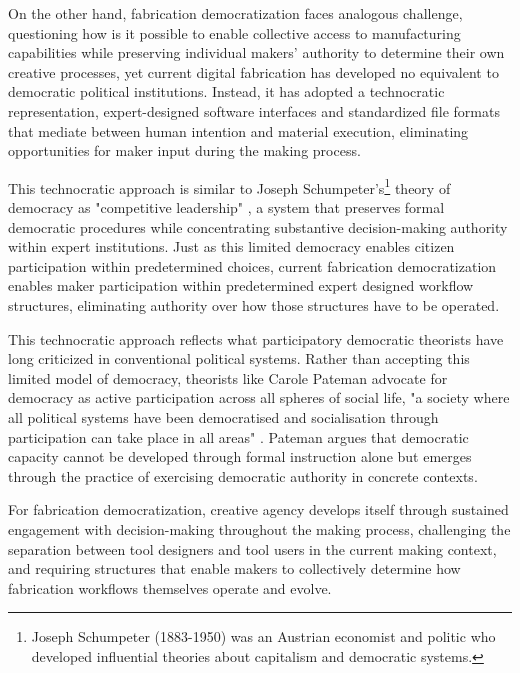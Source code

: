 \vspace{0.5cm}

On the other hand, fabrication democratization faces analogous challenge, questioning how is it possible to enable collective access to manufacturing capabilities while preserving individual makers' authority to determine their own creative processes, yet current digital fabrication has developed no equivalent to democratic political institutions. Instead, it has adopted a technocratic representation, expert-designed software interfaces and standardized file formats that mediate between human intention and material execution, eliminating opportunities for maker input during the making process.

\vspace{0.5cm}

This technocratic approach is similar to Joseph Schumpeter's\footnote{Joseph Schumpeter (1883-1950) was an Austrian economist and politic who developed influential theories about capitalism and democratic systems.} theory of democracy as "competitive leadership" \citep{schumpeter1950}, a system that preserves formal democratic procedures while concentrating substantive decision-making authority within expert institutions. Just as this limited democracy enables citizen participation within predetermined choices, current fabrication democratization enables maker participation within predetermined expert designed workflow structures, eliminating authority over how those structures have to be operated.

\vspace{0.5cm}

This technocratic approach reflects what participatory democratic theorists have long criticized in conventional political systems. Rather than accepting this limited model of democracy, theorists like Carole Pateman advocate for democracy as active participation across all spheres of social life, "a society where all political systems have been democratised and socialisation through participation can take place in all areas" \citep{pateman1976}. Pateman argues that democratic capacity cannot be developed through formal instruction alone but emerges through the practice of exercising democratic authority in concrete contexts.

\vspace{0.5cm}

For fabrication democratization, creative agency develops itself through sustained engagement with decision-making throughout the making process, challenging the separation between tool designers and tool users in the current making context, and requiring structures that enable makers to collectively determine how fabrication workflows themselves operate and evolve.

